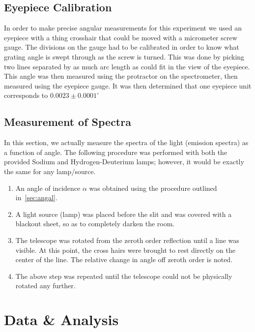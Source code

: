 \documentclass[paper=a4, fontsize=11pt]{scrartcl} %
\numberwithin{equation}{section}
\numberwithin{figure}{section}
\numberwithin{table}{section}
\begin{document}
\subsection{Eyepiece Calibration}
\label{sec:eyecal}

In order to make precise angular measurements for this experiment we
used an eyepiece with a thing crosshair that could be moved with a
micrometer screw gauge. The divisions on the gauge had to be
calibrated in order to know what grating angle is swept through as the
screw is turned. This was done by picking two lines separated by as
much arc length as could fit in the view of the eyepiece. This angle
was then measured using the protractor on the spectrometer, then
measured using the eyepiece gauge. It was then determined that one
eyepiece unit corresponds to $0.0023\pm0.0001^{\circ}$
\subsection{Measurement of Spectra}
\label{sec:specmes}
In this section, we actually measure the spectra of the light (emission spectra) as a function of angle. The following procedure was performed with both the provided Sodium and Hydrogen-Deuterium lamps; however, it would be exactly the same for any lamp/source.

\begin{enumerate}
\item An angle of incidence $\alpha$ was obtained using the procedure
  outlined in~\ref{sec:angal}.
\item A light source (lamp) was placed before the slit and was covered with a blackout sheet, so as to completely darken the room.
\item The telescope was rotated from the zeroth order reflection until a line was visible. At this point, the cross hairs were brought to rest directly on the center of the line. The relative change in angle off zeroth order is noted.
\item The above step was repeated until the telescope could not be physically rotated any further.
\end{enumerate}




\section{Data \& Analysis}
\end{document}
